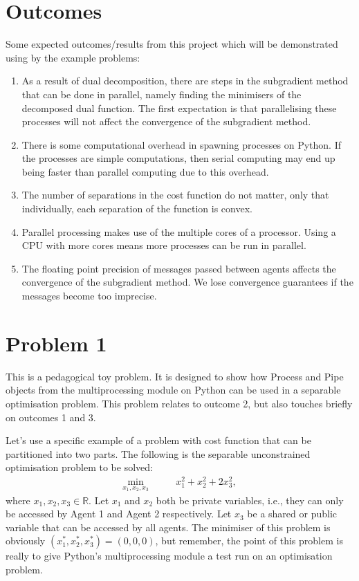 \documentclass[12pt]{article}
\begin{document}
\section*{Outcomes}

Some expected outcomes/results from this project which will be demonstrated using by the example problems:

\begin{enumerate}
	\item As a result of dual decomposition, there are steps in the subgradient method that can be done in parallel, namely finding the minimisers of the decomposed dual function. The first expectation is that parallelising these processes will not affect the convergence of the subgradient method.
	\item There is some computational overhead in spawning processes on Python. If the processes are simple computations, then serial computing may end up being faster than parallel computing due to this overhead.
	\item The number of separations in the cost function do not matter, only that individually, each separation of the function is convex.
	\item Parallel processing makes use of the multiple cores of a processor. Using a CPU with more cores means more processes can be run in parallel.
	\item The floating point precision of messages passed between agents affects the convergence of the subgradient method. We lose convergence guarantees if the messages become too imprecise.
\end{enumerate}

\section*{Problem 1}

This is a pedagogical toy problem. It is designed to show how Process and Pipe objects from the multiprocessing module on Python can be used in a separable optimisation problem. This problem relates to outcome 2, but also touches briefly on outcomes 1 and 3.

Let's use a specific example of a problem with cost function that can be partitioned into two parts. The following is the separable unconstrained optimisation problem to be solved:
\begin{align*}
\min_{x_1,x_2,x_3}\qquad& x_1^2+x_2^2+2x_3^2,
\end{align*}
where $x_1,x_2,x_3\in\mathbb{R}$. Let $x_1$ and $x_2$ both be private variables, i.e., they can only be accessed by Agent 1 and Agent 2 respectively. Let $x_3$ be a shared or public variable that can be accessed by all agents. The minimiser of this problem is obviously $(x_1^*,x_2^*,x_3^*)=(0,0,0)$, but remember, the point of this problem is really to give Python's multiprocessing module a test run on an optimisation problem. 
\end{document}
